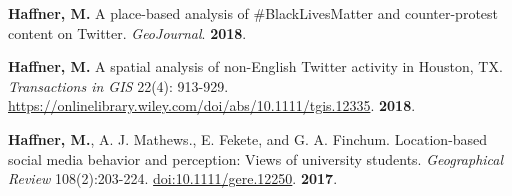 




\begin{cventries}
   \cventry
      {}
      {}
      {}
      {}
      {
        \begin{cvitems}
          \vspace{-4mm}
        \item
          {\textbf{Haffner, M.}
            A place-based analysis of \#BlackLivesMatter and counter-protest
            content on Twitter. \textit{GeoJournal}. \textbf{2018}.} \\
          \vspace{-2mm}
        \end{cvitems}
    }

   \cventry
      {}
      {}
      {}
      {}
      {
        \begin{cvitems}
          \vspace{-4mm}
        \item {\textbf{Haffner, M.} A spatial analysis of non-English Twitter
            activity in Houston, TX. \textit{Transactions in GIS} 22(4):
            913-929. \href{https://onlinelibrary.wiley.com/doi/abs/10.1111/tgis.12335}{https://onlinelibrary.wiley.com/doi/abs/10.1111/tgis.12335}.}
            \textbf{2018}. \\
          \vspace{-2mm}
        \end{cvitems}
    }

   \cventry
      {}
      {}
      {}
      {}
      {
        \begin{cvitems}
          \vspace{-4mm} \item {\textbf{Haffner, M.}, A. J. Mathews., E. Fekete, and
            G. A. Finchum. Location-based social media behavior and perception:
            Views of university students. \textit{Geographical Review} 108(2):203-224.
            \href{http://onlinelibrary.wiley.com/doi/10.1111/gere.12250/abstract}{doi:10.1111/gere.12250}.}
          \textbf{2017}.
          \\
          \vspace{-2mm}
        \end{cvitems}
    } %


\end{cventries}
